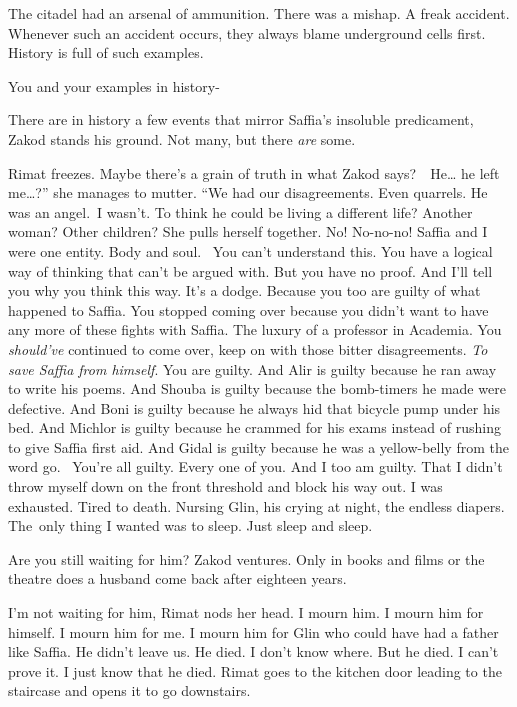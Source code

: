 \documentclass[letterpaper]{article}
\begin{document}
{\textquotedbl}The citadel had an arsenal of ammunition. There was a mishap. A freak accident. Whenever such an accident
occurs, they always blame underground cells first. History is full of such examples.{\textquotedbl} 

{\textquotedbl}You and your examples in history-{\textquotedbl} 

{\textquotedbl}There are in history a few events that mirror Saffia's insoluble predicament,{\textquotedbl} Zakod stands
his ground. {\textquotedbl}Not many, but there \textit{are} some.{\textquotedbl}

Rimat freezes. Maybe there's a grain of truth in what Zakod says?\ \ {\textquotedbl}He{\dots} he left me{\dots}?'' she
manages to mutter. ``We had our disagreements. Even quarrels. He was an angel.\ I wasn't. To think he could be living a
different life? Another woman? Other children?{\textquotedbl} She pulls herself together. {\textquotedbl}No! No-no-no!
Saffia and I were one entity. Body and soul.~ You can't understand this. You have a logical way of thinking that can't
be argued with. But you have no proof. And I'll tell you why you think this way. It's a dodge. Because you too are
guilty of what happened to Saffia. You stopped coming over because you didn't want to have any more of these fights
with Saffia. The luxury of a professor in Academia. You \textit{should've} continued to come over, keep on with those
bitter disagreements. \textit{To save Saffia from himself}. You are guilty. And Alir is guilty because he ran away to
write his poems. And Shouba is guilty because the bomb-timers he made were defective. And Boni is guilty because he
always hid that bicycle pump under his bed. And Michlor is guilty because he crammed for his exams instead of rushing
to give Saffia first aid. And Gidal is guilty because he was a yellow-belly from the word go. \ You{}'re all guilty.
Every one of you. And I too am guilty. That I didn't throw myself down on the front threshold and block his way out. I
was exhausted. Tired to death. Nursing Glin, his crying at night, the endless diapers. The~only thing I wanted was to
sleep. Just sleep and sleep.{\textquotedbl} 

{\textquotedbl}Are you still waiting for him?{\textquotedbl} Zakod ventures. {\textquotedbl}Only in books and films or
the theatre does a husband come back after eighteen years.{\textquotedbl}

{\textquotedbl}I'm not waiting for him,{\textquotedbl} Rimat nods her head. {\textquotedbl}I mourn him. I mourn him for
himself. I mourn him for me. I mourn him for Glin who could have had a father like Saffia. He didn't leave us. He died.
I don't know where. But he died. I can't prove it. I just know that he died.{\textquotedbl} Rimat goes to the kitchen
door leading to the staircase and opens it to go downstairs. 
\end{document}
